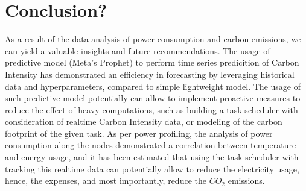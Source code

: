\section{Conclusion?}
\noindent

As a result of the data analysis of power consumption and carbon emissions, we can yield a valuable insights and future recommendations.
The usage of predictive model (Meta’s Prophet) to perform time series predicition of Carbon Intensity has demonstrated an efficiency in forecasting by leveraging historical data and hyperparameters, compared to simple lightweight model.
The usage of such predictive model potentially can allow to implement proactive measures to reduce the effect of heavy computations, such as building a task scheduler with consideration of realtime Carbon Intensity data, or modeling of the carbon footprint of the given task.
As per power profiling, the analysis of power consumption along the nodes demonstrated a correlation between temperature and energy usage, and it has been estimated that using the task scheduler with tracking this realtime data  can potentially allow to reduce the electricity usage, hence, the expenses, and most importantly, reduce the $CO_2$ emissions.